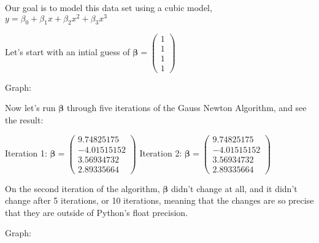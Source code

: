 \documentclass[12pt]{article}
\begin{document}
\vskip 0.2cm

Our goal is to model this data set using a cubic model, $y = \beta_0 + \beta_{1}x + \beta_{2}x^2 + \beta_{3}x^3$

Let's start with an intial guess of $\boldsymbol{\beta} = \begin{pmatrix} 1 \\ 1  \\ 1 \\ 1\end{pmatrix}$

Graph:


\vskip 0.2cm

Now let's run $\boldsymbol{\beta}$ through five iterations of the Gauss Newton Algorithm, and see the result:

Iteration 1: $\boldsymbol{\beta} = \begin{pmatrix} 9.74825175\\  -4.01515152 \\ 3.56934732\\ 2.89335664 \end{pmatrix}$ 
\vskip 0.2cm
Iteration 2: $\boldsymbol{\beta} = \begin{pmatrix} 9.74825175\\  -4.01515152 \\ 3.56934732\\ 2.89335664 \end{pmatrix}$ 
\vskip 1cm

On the second iteration of the algorithm, $\boldsymbol{\beta}$ didn't change at all, and it didn't change after 5 iterations, or 10 iterations, meaning that the changes are so precise that they are outside of Python's float precision.

\vskip 1cm

Graph:

\vskip 0.2cm

\end{document}
